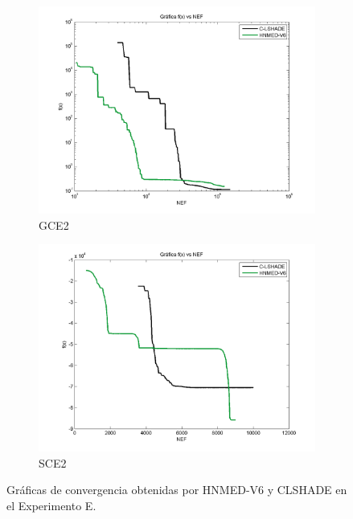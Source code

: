 \begin{figure}
\begin{subfigure}[b]{0.49\linewidth}
		\includegraphics[width=\linewidth]{Figures/E-Grafica_Convergencia_Problema_5}
		\caption{GCE2} \label{fig:G2} 
	\end{subfigure}
	\begin{subfigure}[b]{0.49\linewidth}
		\includegraphics[width=\linewidth]{Figures/E-Grafica_Convergencia_Problema_6}
		\caption{SCE2} \label{fig:S1} 
	\end{subfigure}
	\caption{Gráficas de convergencia obtenidas por HNMED-V6 y CLSHADE en el Experimento E.} \label{fig: Gráficas de convergencia obtenidas por HNMED-V6 y CLSHADE para el Experimento E.} 
	
\end{figure}


